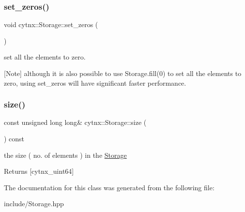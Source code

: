 \begin{DoxyVerbInclude}
\end{DoxyVerbInclude}
 \mbox{\label{classcytnx_1_1Storage_a7e854529c99108b0acc3e5e2b185244b}} 
\subsubsection{\texorpdfstring{set\+\_\+zeros()}{set\_zeros()}}
{\footnotesize\ttfamily void cytnx\+::\+Storage\+::set\+\_\+zeros (\begin{DoxyParamCaption}{ }\end{DoxyParamCaption})\hspace{0.3cm}{\ttfamily [inline]}}



set all the elements to zero. 

\mbox{[}Note\mbox{]} although it is also possible to use Storage.\+fill(0) to set all the elements to zero, using set\+\_\+zeros will have significant faster performance. \mbox{\label{classcytnx_1_1Storage_aaf36262622abdab03c90b713c454f78e}} 
\subsubsection{\texorpdfstring{size()}{size()}}
{\footnotesize\ttfamily const unsigned long long\& cytnx\+::\+Storage\+::size (\begin{DoxyParamCaption}{ }\end{DoxyParamCaption}) const\hspace{0.3cm}{\ttfamily [inline]}}



the size ( no. of elements ) in the \hyperlink{classcytnx_1_1Storage}{Storage} 

\begin{DoxyReturn}{Returns}
\mbox{[}cytnx\+\_\+uint64\mbox{]} 
\end{DoxyReturn}


The documentation for this class was generated from the following file\+:\begin{DoxyCompactItemize}
\item 
include/Storage.\+hpp\end{DoxyCompactItemize}
